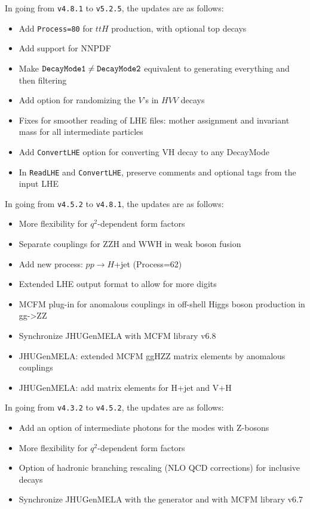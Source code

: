 \documentclass[aps,superscriptaddress,nofootinbib]{revtex4}
\begin{document}
\noindent
In going from \verb|v4.8.1| to \verb|v5.2.5|, the updates are as follows:

\begin{itemize}
\item Add \verb|Process=80| for $ttH$ production, with optional top decays
\item Add support for NNPDF
\item Make $\verb|DecayMode1|\ne\verb|DecayMode2|$ equivalent to generating everything and then filtering
\item Add option for randomizing the $V$'s in $HVV$ decays
\item Fixes for smoother reading of LHE files: mother assignment and invariant mass for all intermediate particles
\item Add \verb|ConvertLHE| option for converting VH decay to any DecayMode
\item In \verb|ReadLHE| and \verb|ConvertLHE|, preserve comments and optional tags from the input LHE
\end{itemize}

\noindent
In going from \verb|v4.5.2| to \verb|v4.8.1|, the updates are as follows:

\begin{itemize}
\item More flexibility for $q^2$-dependent form factors
\item Separate couplings for ZZH and WWH in weak boson fusion
\item Add new process: $pp\to H$+jet (Process=62)
\item Extended LHE output format to allow for more digits
\item MCFM plug-in for anomalous couplings in off-shell Higgs boson production in gg->ZZ
\item Synchronize JHUGenMELA with MCFM library v6.8
\item JHUGenMELA: extended MCFM ggHZZ matrix elements by anomalous couplings
\item JHUGenMELA: add matrix elements for H+jet and V+H
\end{itemize}


\noindent
In going from \verb|v4.3.2| to \verb|v4.5.2|, the updates are as follows:

\begin{itemize}
\item Add an option of intermediate photons for the modes with Z-bosons
\item More flexibility for $q^2$-dependent form factors
\item Option of hadronic branching rescaling (NLO QCD corrections) for inclusive decays
\item Synchronize JHUGenMELA with the generator and with MCFM library v6.7
\end{itemize}
\end{document}

